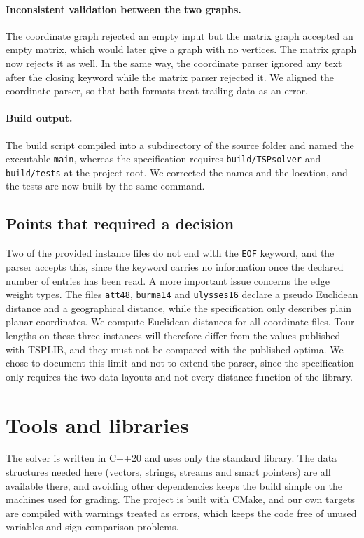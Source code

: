 \documentclass[11pt,a4paper]{article}
\begin{document}
\paragraph{Inconsistent validation between the two graphs.} The coordinate graph rejected an empty input but the matrix graph accepted an empty matrix, which would later give a graph with no vertices. The matrix graph now rejects it as well. In the same way, the coordinate parser ignored any text after the closing keyword while the matrix parser rejected it. We aligned the coordinate parser, so that both formats treat trailing data as an error.

\paragraph{Build output.} The build script compiled into a subdirectory of the source folder and named the executable \texttt{main}, whereas the specification requires \texttt{build/TSPsolver} and \texttt{build/tests} at the project root. We corrected the names and the location, and the tests are now built by the same command.

\subsection{Points that required a decision}

Two of the provided instance files do not end with the \texttt{EOF} keyword, and the parser accepts this, since the keyword carries no information once the declared number of entries has been read. A more important issue concerns the edge weight types. The files \texttt{att48}, \texttt{burma14} and \texttt{ulysses16} declare a pseudo Euclidean distance and a geographical distance, while the specification only describes plain planar coordinates. We compute Euclidean distances for all coordinate files. Tour lengths on these three instances will therefore differ from the values published with TSPLIB, and they must not be compared with the published optima. We chose to document this limit and not to extend the parser, since the specification only requires the two data layouts and not every distance function of the library.

\section{Tools and libraries}

The solver is written in C++20 and uses only the standard library. The data structures needed here (vectors, strings, streams and smart pointers) are all available there, and avoiding other dependencies keeps the build simple on the machines used for grading. The project is built with CMake, and our own targets are compiled with warnings treated as errors, which keeps the code free of unused variables and sign comparison problems.
\end{document}
